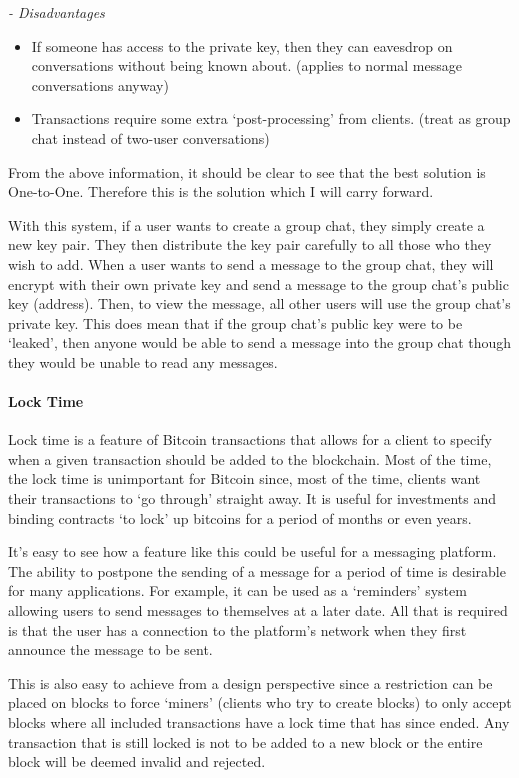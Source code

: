 \documentclass{article}
\begin{document}
\textit{ - Disadvantages}
\begin{itemize}
    \item If someone has access to the private key, then they can eavesdrop on conversations without being known about. (applies to normal message conversations anyway)
    \item Transactions require some extra `post-processing' from clients. (treat as group chat instead of two-user conversations)
\end{itemize}

From the above information, it should be clear to see that the best solution is One-to-One. Therefore this is the solution which I will carry forward.

With this system, if a user wants to create a group chat, they simply create a new key pair. They then distribute the key pair carefully to all those who they wish to add. When a user wants to send a message to the group chat, they will encrypt with their own private key and send a message to the group chat's public key (address). Then, to view the message, all other users will use the group chat's private key. This does mean that if the group chat's public key were to be `leaked', then anyone would be able to send a message into the group chat though they would be unable to read any messages.
\newpage

\paragraph{Lock Time}
Lock time is a feature of Bitcoin transactions that allows for a client to specify when a given transaction should be added to the blockchain. Most of the time, the lock time is unimportant for Bitcoin since, most of the time, clients want their transactions to `go through' straight away. It is useful for investments and binding contracts `to lock' up bitcoins for a period of months or even years.

It's easy to see how a feature like this could be useful for a messaging platform. The ability to postpone the sending of a message for a period of time is desirable for many applications. For example, it can be used as a `reminders' system allowing users to send messages to themselves at a later date. All that is required is that the user has a connection to the platform's network when they first announce the message to be sent. 

This is also easy to achieve from a design perspective since a restriction can be placed on blocks to force `miners' (clients who try to create blocks) to only accept blocks where all included transactions have a lock time that has since ended. Any transaction that is still locked is not to be added to a new block or the entire block will be deemed invalid and rejected.
\end{document}
